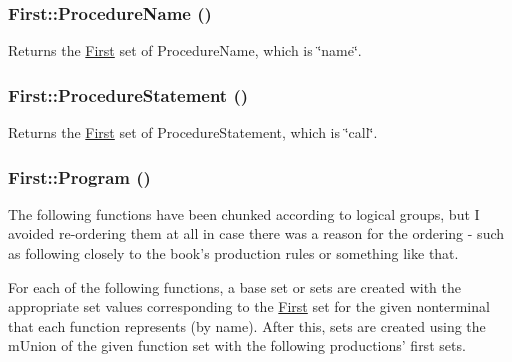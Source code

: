 \hypertarget{classFirst_a677ce3d90fae56d10823b59f73930023}{
\subsubsection[{ProcedureName}]{ First::ProcedureName ()}}
\label{classFirst_a677ce3d90fae56d10823b59f73930023}


Returns the \hyperlink{classFirst}{First} set of ProcedureName, which is \char`\"{}name\char`\"{}. 

\hypertarget{classFirst_a4119362212a222c5b738957f325927ef}{
\subsubsection[{ProcedureStatement}]{ First::ProcedureStatement ()}}
\label{classFirst_a4119362212a222c5b738957f325927ef}


Returns the \hyperlink{classFirst}{First} set of ProcedureStatement, which is \char`\"{}call\char`\"{}. 

\hypertarget{classFirst_a5d7cc34fb31a5d9b862fd2dcfc7613b5}{
\subsubsection[{Program}]{ First::Program ()}}
\label{classFirst_a5d7cc34fb31a5d9b862fd2dcfc7613b5}


The following functions have been chunked according to logical groups, but I avoided re-\/ordering them at all in case there was a reason for the ordering -\/ such as following closely to the book's production rules or something like that. 

For each of the following functions, a base set or sets are created with the appropriate set values corresponding to the \hyperlink{classFirst}{First} set for the given nonterminal that each function represents (by name). After this, sets are created using the mUnion of the given function set with the following productions' first sets.

